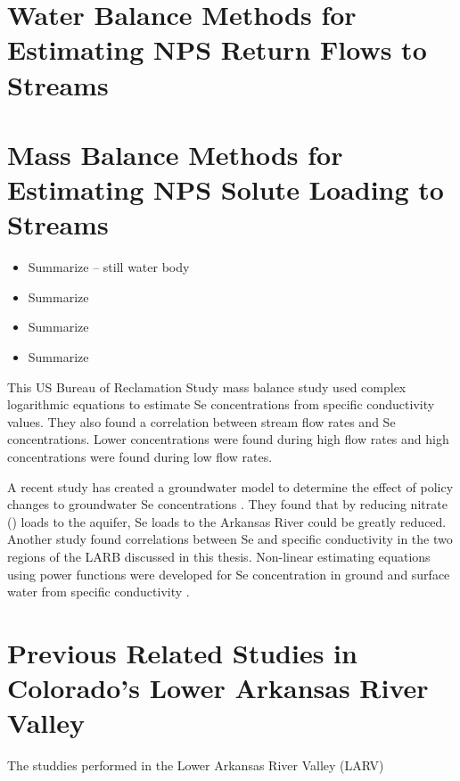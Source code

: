 \begin{linenumbers}[1]
\clearpage{}
\section{Water Balance Methods for Estimating NPS Return Flows to Streams}
\label{sec:water balance methods}

\clearpage{}
\section{Mass Balance Methods for Estimating NPS Solute Loading to Streams}
\label{sec:mass balance methods}
\begin{itemize}
	\item Summarize \citep{Gersberg2006}-- still water body
	\item Summarize \citep{Takayanagi1984}
	\item Summarize \citep{Mueller2008}
	\item Summarize \citep{Miller2010}
\end{itemize}

This US Bureau of Reclamation Study mass balance study used complex logarithmic equations to estimate Se concentrations from specific conductivity values.  They also found a correlation between stream flow rates and Se concentrations.  Lower concentrations were found during high flow rates and high concentrations were found during low flow rates.  \citep{2008USBR}

A recent study has created a groundwater model to determine the effect of policy changes to groundwater Se concentrations \citep{2012Bailey}.  They found that by reducing nitrate (\nitrate) loads to the aquifer, Se loads to the Arkansas River could be greatly reduced.  Another study found correlations between Se and specific conductivity in the two regions of the LARB discussed in this thesis.  Non-linear estimating equations using power functions were developed for Se concentration in ground and surface water from specific conductivity \citep{2010Cody}.

\clearpage{}
\section{Previous Related Studies in Colorado's Lower Arkansas River Valley}
\label{sec:previous studies}

The studdies performed in the Lower Arkansas River Valley (LARV)

\clearpage{}

\end{linenumbers}
